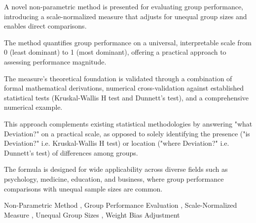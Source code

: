 \documentclass[a4paper,fleqn,review]{cas-sc}
\begin{document}
\begin{highlights}
	\item A novel non-parametric method is presented for evaluating group performance, introducing a scale-normalized measure that adjusts for unequal group sizes and enables direct comparisons.
	\item The method quantifies group performance on a universal, interpretable scale from 0 (least dominant) to 1 (most dominant), offering a practical approach to assessing performance magnitude.
	\item The measure's theoretical foundation is validated through a combination of formal mathematical derivations, numerical cross-validation against established statistical tests (Kruskal-Wallis H test and Dunnett’s test), and a comprehensive numerical example.
	\item This approach complements existing statistical methodologies by answering "what Deviation?" on a practical scale, as opposed to solely identifying the presence ("is Deviation?" i.e. Kruskal-Wallis H test) or location ("where Deviation?" i.e. Dunnett's test) of differences among groups.
	\item The formula is designed for wide applicability across diverse fields such as psychology, medicine, education, and business, where group performance comparisons with unequal sample sizes are common.
\end{highlights}

\begin{keywords}
	Non-Parametric Method \sep 
	Group Performance Evaluation \sep
	Scale-Normalized Measure \sep 
	Unequal Group Sizes \sep 
	Weight Bias Adjustment 
\end{keywords}
\maketitle
\end{document}

